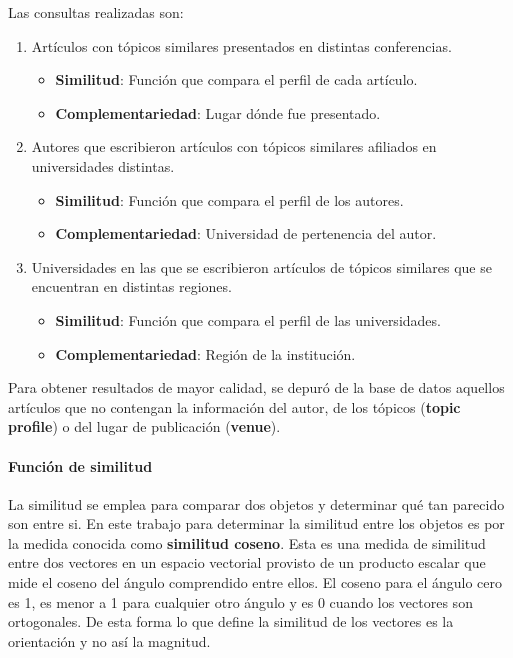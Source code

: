 Las consultas realizadas son:
\begin{enumerate}
	\item
		Artículos con tópicos similares presentados en distintas conferencias.
		\begin{itemize}
			\item \textbf{Similitud}: Función que compara el perfil de cada artículo.
			\item \textbf{Complementariedad}: Lugar dónde fue presentado.
		\end{itemize}

	\item
	Autores que escribieron artículos con tópicos similares afiliados en universidades distintas.
	\begin{itemize}
		\item \textbf{Similitud}: Función que compara el perfil de los autores.
		\item \textbf{Complementariedad}: Universidad de pertenencia del autor.
	\end{itemize}

	\item 
	Universidades en las que se escribieron artículos de tópicos similares que se encuentran en distintas regiones. 
	\begin{itemize}
		\item \textbf{Similitud}: Función que compara el perfil de las universidades.
		\item \textbf{Complementariedad}: Región de la institución.
	\end{itemize}
\end {enumerate}

Para obtener resultados de mayor calidad, se depuró de la base de datos aquellos artículos que no contengan la información del autor, de los tópicos (\textbf{topic profile}) o del lugar de publicación (\textbf{venue}). 

\paragraph{Función de similitud}
La similitud se emplea para comparar dos objetos y determinar qué tan parecido son entre si. En este trabajo para determinar la similitud entre los objetos es por la medida conocida como \textbf{similitud coseno}. Esta es una medida de similitud entre dos vectores en un espacio vectorial provisto de un producto escalar que mide el coseno del ángulo comprendido entre ellos. El coseno para el ángulo cero es 1, es menor a 1 para cualquier otro ángulo y es 0 cuando los vectores son ortogonales. De esta forma lo que define la similitud de los vectores es la orientación y no así la magnitud.

